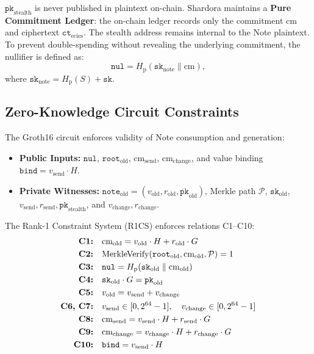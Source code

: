 \documentclass[journal,10pt,twocolumn]{IEEEtran}
\theoremstyle{definition}
\theoremstyle{remark}
\begin{document}
$\mathtt{pk}_{\text{stealth}}$ is never published in plaintext on-chain. Shardora maintains a \textbf{Pure Commitment Ledger}: the on-chain ledger records only the commitment $\text{cm}$ and ciphertext $\mathtt{ct}_{\text{ecies}}$. The stealth address remains internal to the Note plaintext. To prevent double-spending without revealing the underlying commitment, the nullifier is defined as:
\begin{equation}
\mathtt{nul} = H_{\text{p}}(\mathtt{sk}_{\text{note}} \parallel \text{cm}),
\end{equation}
where $\mathtt{sk}_{\text{note}} = H_{\text{p}}(S) + \mathtt{sk}$.

\subsection{Zero-Knowledge Circuit Constraints}
The Groth16 circuit enforces validity of Note consumption and generation:
\begin{itemize}[leftmargin=*]
    \item \textbf{Public Inputs:} $\mathtt{nul}$, $\mathtt{root}_{\text{old}}$, $\text{cm}_{\text{send}}$, $\text{cm}_{\text{change}}$, and value binding $\mathtt{bind} = v_{\text{send}} \cdot H$.
    \item \textbf{Private Witnesses:} $\mathtt{note}_{\text{old}} = (v_{\text{old}}, r_{\text{old}}, \mathtt{pk}_{\text{old}})$, Merkle path $\mathcal{P}$, $\mathtt{sk}_{\text{old}}$, $v_{\text{send}}, r_{\text{send}}, \mathtt{pk}_{\text{stealth}}$, and $v_{\text{change}}, r_{\text{change}}$.
\end{itemize}

The Rank-1 Constraint System (R1CS) enforces relations C1--C10:
\begin{align}
\text{\textbf{C1:}} \quad & \text{cm}_{\text{old}} = v_{\text{old}} \cdot H + r_{\text{old}} \cdot G \\
\text{\textbf{C2:}} \quad & \text{MerkleVerify}(\mathtt{root}_{\text{old}}, \text{cm}_{\text{old}}, \mathcal{P}) = 1 \\
\text{\textbf{C3:}} \quad & \mathtt{nul} = H_{\text{p}}(\mathtt{sk}_{\text{old}} \parallel \text{cm}_{\text{old}}) \\
\text{\textbf{C4:}} \quad & \mathtt{sk}_{\text{old}} \cdot G = \mathtt{pk}_{\text{old}} \\
\text{\textbf{C5:}} \quad & v_{\text{old}} = v_{\text{send}} + v_{\text{change}} \\
\text{\textbf{C6, C7:}} \quad & v_{\text{send}} \in [0, 2^{64}-1], \quad v_{\text{change}} \in [0, 2^{64}-1] \\
\text{\textbf{C8:}} \quad & \text{cm}_{\text{send}} = v_{\text{send}} \cdot H + r_{\text{send}} \cdot G \\
\text{\textbf{C9:}} \quad & \text{cm}_{\text{change}} = v_{\text{change}} \cdot H + r_{\text{change}} \cdot G \\
\text{\textbf{C10:}} \quad & \mathtt{bind} = v_{\text{send}} \cdot H
\end{align}
\end{document}
